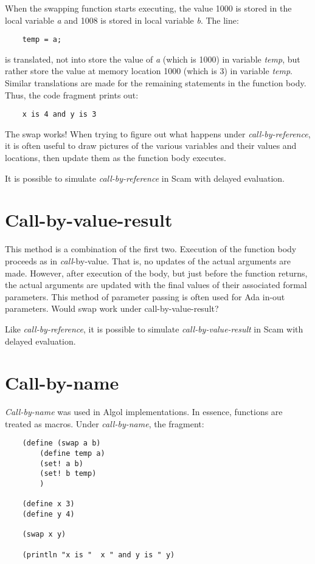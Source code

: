 When the swapping function starts executing, the value 1000 is stored
in the local variable {\it a} and 1008 is stored in local variable {\it b}.
The line:

\begin{verbatim}
    temp = a;
\end{verbatim}

is translated, not into store the value of {\it a} (which is 1000) in
variable {\it temp}, but rather store the value at memory location 1000 (which
is 3) in variable {\it temp}. Similar translations are made for the remaining
statements in the function body. Thus, the code fragment prints out:

\begin{verbatim}
    x is 4 and y is 3
\end{verbatim}

The swap works! When trying to figure out what happens under
{\it call-by-reference}, it is often useful to draw pictures of the various
variables and their values and locations, then update them as the function
body executes.

It is possible to simulate {\it call-by-reference} in Scam
with delayed evaluation.

\section*{Call-by-value-result}

This method is a combination of the first two. Execution of the function
body proceeds as in {\it call}-by-value. That is, no updates of the actual
arguments are made. However, after execution of the body, but just before
the function returns, the actual arguments are updated with the final
values of their associated formal parameters. This method of parameter
passing is often used for Ada in-out parameters. Would swap work under
call-by-value-result? 

Like {\it call-by-reference},
it is possible to simulate {\it call-by-value-result} in Scam
with delayed evaluation.

\section*{Call-by-name}

{\it Call-by-name} was used in Algol implementations. In essence, functions
are treated as macros. Under {\it call-by-name}, the fragment:

\begin{verbatim}
    (define (swap a b)
        (define temp a)
        (set! a b)
        (set! b temp)
        )

    (define x 3)
    (define y 4)

    (swap x y)

    (println "x is "  x " and y is " y)
\end{verbatim}

